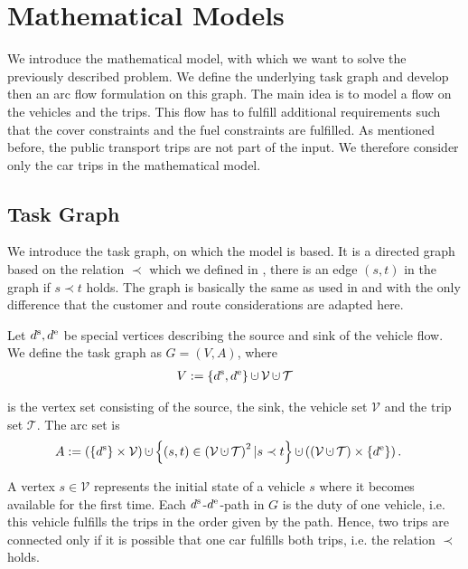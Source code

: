 \chapter{Mathematical Models}
\label{ch:mathematical_models}

We introduce the mathematical model, with which we want to solve the previously described problem. We define the underlying task graph and develop then an arc flow formulation on this graph. The main idea is to model a flow on the vehicles and the trips. This flow has to fulfill additional requirements such that the cover constraints and the fuel constraints are fulfilled. As mentioned before, the public transport trips are not part of the input. We therefore consider only the car trips in the mathematical model.

\section{Task Graph}

We introduce the task graph, on which the model is based. It is a directed graph based on the relation $\prec$ which we defined in , \ie there is an edge $(s,t)$ in the graph if $s\prec t$ holds. The graph is basically the same as used in \cite{Kaiser} and \cite{Knoll} with the only difference that the customer and route considerations are adapted here.

\begin{definition}
\label{def:taskgraph}

Let $d^{\operatorname{s}},d^{\operatorname{e}}$ be special vertices describing the source and sink of the vehicle flow. We define the task graph as $G=(V,A)$, where
\begin{align*}
	V:=\left\{\ds,\de\right\}\cupdot\mathcal{V}\cupdot\mathcal{T}
\end{align*}

is the vertex set consisting of the source, the sink, the vehicle set $\mathcal{V}$ and the trip set $\mathcal{T}$. The arc set is
\begin{align*}
	A & :=\left(\left\{\ds\right\}\times\mathcal{V}\right)\cupdot\left\{(s,t)\in\left(\mathcal{V}\cupdot\mathcal{T}\right)^2|s\prec t\right\}\cupdot\left(\left(\mathcal{V}\cupdot\mathcal{T}\right)\times\left\{\de\right\}\right).
\end{align*}

\end{definition}

A vertex $s\in\mathcal{V}$ represents the initial state of a vehicle $s$ where it becomes available for the first time. Each $d^{\operatorname{s}}$-$d^{\operatorname{e}}$-path in $G$ is the duty of one vehicle, i.e. this vehicle fulfills the trips in the order given by the path. Hence, two trips are connected only if it is possible that one car fulfills both trips, i.e. the relation $\prec$ holds.

